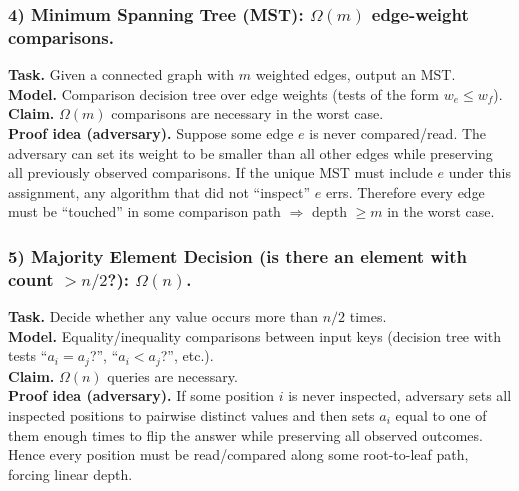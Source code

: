 \documentclass[9pt]{extarticle}
\begin{document}
\subsubsection{4) Minimum Spanning Tree (MST): $\Omega(m)$ edge-weight comparisons.}
\textbf{Task.} Given a connected graph with $m$ weighted edges, output an MST.\\
\textbf{Model.} Comparison decision tree over edge weights (tests of the form $w_e \le w_f$).\\
\textbf{Claim.} $\Omega(m)$ comparisons are necessary in the worst case.\\
\textbf{Proof idea (adversary).} Suppose some edge $e$ is never compared/read. The adversary can set its weight to be smaller than all other edges while preserving all previously observed comparisons. If the unique MST must include $e$ under this assignment, any algorithm that did not “inspect” $e$ errs. Therefore every edge must be “touched” in some comparison path $\Rightarrow$ depth $\ge m$ in the worst case.

\subsubsection{5) Majority Element Decision (is there an element with count $> n/2$?): $\Omega(n)$.}
\textbf{Task.} Decide whether any value occurs more than $n/2$ times.\\
\textbf{Model.} Equality/inequality comparisons between input keys (decision tree with tests “$a_i=a_j$?”, “$a_i<a_j$?”, etc.).\\
\textbf{Claim.} $\Omega(n)$ queries are necessary.\\
\textbf{Proof idea (adversary).} If some position $i$ is never inspected, adversary sets all inspected positions to pairwise distinct values and then sets $a_i$ equal to one of them enough times to flip the answer while preserving all observed outcomes. Hence every position must be read/compared along some root-to-leaf path, forcing linear depth.

\end{document}
